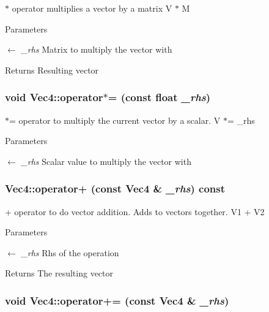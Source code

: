 $\ast$ operator multiplies a vector by a matrix V $\ast$ M 
\begin{DoxyParams}{Parameters}
\item[\mbox{$\leftarrow$} {\em \_\-rhs}]Matrix to multiply the vector with \end{DoxyParams}
\begin{DoxyReturn}{Returns}
Resulting vector 
\end{DoxyReturn}
\hypertarget{classVec4_a98eed34b9e22227e1e448bbc9345f50e}{
\subsubsection[{operator$\ast$=}]{\setlength{\rightskip}{0pt plus 5cm}void Vec4::operator$\ast$= (const float {\em \_\-rhs})}}
\label{classVec4_a98eed34b9e22227e1e448bbc9345f50e}


$\ast$= operator to multiply the current vector by a scalar. V $\ast$= \_\-rhs 
\begin{DoxyParams}{Parameters}
\item[\mbox{$\leftarrow$} {\em \_\-rhs}]Scalar value to multiply the vector with \end{DoxyParams}
\hypertarget{classVec4_a58014ec694674a8c27587a03037f0f09}{
\subsubsection[{operator+}]{ Vec4::operator+ (const {\bf Vec4} \& {\em \_\-rhs}) const}}
\label{classVec4_a58014ec694674a8c27587a03037f0f09}


+ operator to do vector addition. Adds to vectors together. V1 + V2 
\begin{DoxyParams}{Parameters}
\item[\mbox{$\leftarrow$} {\em \_\-rhs}]Rhs of the operation \end{DoxyParams}
\begin{DoxyReturn}{Returns}
The resulting vector 
\end{DoxyReturn}
\hypertarget{classVec4_a9d7dbf4c6dc031cbed8a0d5938021821}{
\subsubsection[{operator+=}]{\setlength{\rightskip}{0pt plus 5cm}void Vec4::operator+= (const {\bf Vec4} \& {\em \_\-rhs})}}
\label{classVec4_a9d7dbf4c6dc031cbed8a0d5938021821}


